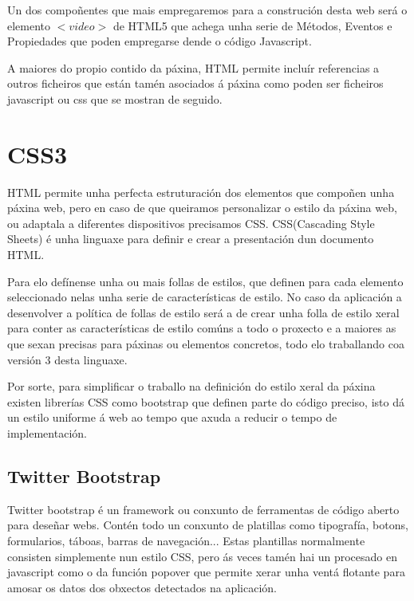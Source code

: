         Un dos compoñentes que mais empregaremos para a construción desta web será o elemento 
        $<video>$ de HTML5 que achega unha serie de Métodos, Eventos e Propiedades
        \cite{w3school-video-events} que poden empregarse dende o código Javascript.
        
        A maiores do propio contido da páxina, HTML permite incluír referencias a outros ficheiros que 
        están tamén asociados á páxina como poden ser ficheiros javascript ou css que se mostran de 
        seguido.
    
    \section{CSS3}
        HTML permite unha perfecta estruturación dos elementos que compoñen unha páxina web, pero 
        en caso de que queiramos personalizar o estilo da páxina web, ou adaptala a diferentes 
        dispositivos precisamos CSS. CSS(Cascading Style Sheets) é unha linguaxe para definir e 
        crear a presentación dun documento HTML.
        
        Para elo defínense unha ou mais follas de estilos, que definen para cada elemento 
        seleccionado nelas unha serie de características de estilo. No caso da aplicación a 
        desenvolver a política de follas de estilo será a de crear unha folla de estilo xeral para 
        conter as características de estilo comúns a todo o proxecto e a maiores as que sexan 
        precisas para páxinas ou elementos concretos, todo elo traballando coa versión 3 desta linguaxe.
    
        Por sorte, para simplificar o traballo na definición do estilo xeral da páxina existen 
        librerías CSS como bootstrap que definen parte do código preciso, isto dá un estilo 
        uniforme á web ao tempo que axuda a reducir o tempo de implementación.
        
        \subsection{Twitter Bootstrap}
            Twitter bootstrap é un framework ou conxunto de ferramentas de código aberto para 
            deseñar webs. Contén todo un conxunto de platillas como tipografía, botons, formularios,
            táboas, barras de navegación... Estas plantillas normalmente consisten simplemente nun
            estilo CSS, pero ás veces tamén hai un procesado en javascript como o da función popover
            que permite xerar unha ventá flotante para amosar os datos dos obxectos detectados na 
            aplicación.
            
